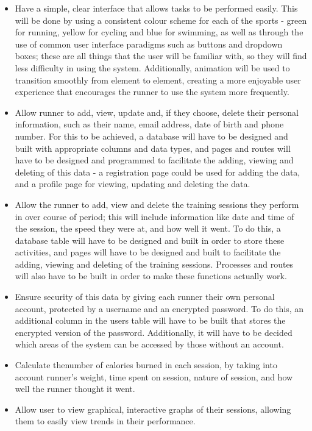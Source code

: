\documentclass{article}[12pt,a4paper]
\begin{document}
\begin{itemize}
    \item Have a simple, clear interface that allows tasks to be performed easily. This will be done by using a consistent colour scheme for each of the sports - green for running, yellow for cycling and blue for swimming, as well as through the use of common user interface paradigms such as buttons and dropdown boxes; these are all things that the user will be familiar with, so they will find less difficulty in using the system. Additionally, animation will be used to transition smoothly from element to element, creating a more enjoyable user experience that encourages the runner to use the system more frequently.
    \item Allow runner to add, view, update and, if they choose, delete their personal information, such as their name, email address, date of birth and phone number. For this to be achieved, a database will have to be designed and built with appropriate columns and data types, and pages and routes will have to be designed and programmed to facilitate the adding, viewing and deleting of this data - a registration page could be used for adding the data, and a profile page for viewing, updating and deleting the data.
    \item Allow the runner to add, view and delete the training sessions they perform in over course of period; this will include information like date and time of the session, the speed they were at, and how well it went. To do this, a database table will have to be designed and built in order to store these activities, and pages will have to be designed and built to facilitate the adding, viewing and deleting of the training sessions. Processes and routes will also have to be built in order to make these functions actually work.
    \item Ensure security of this data by giving each runner their own personal account, protected by a username and an encrypted password. To do this, an additional column in the users table will have to be built that stores the encrypted version of the password. Additionally, it will have to be decided which areas of the system can be accessed by those without an account.
    \item Calculate thenumber of calories burned in each session, by taking into account runner's weight, time spent on session, nature of session, and how well the runner thought it went.
    \item Allow user to view graphical, interactive graphs of their sessions, allowing them to easily view trends in their performance.
\end{itemize}
\end{document}

